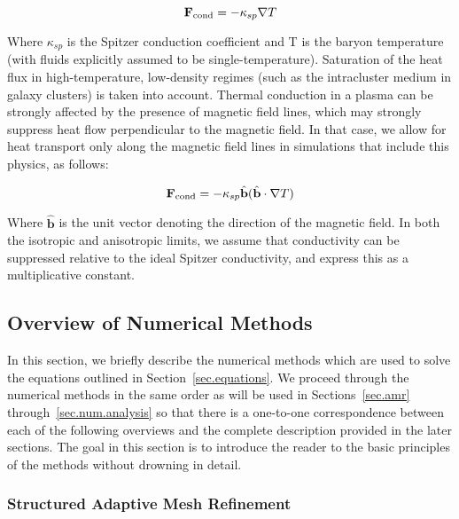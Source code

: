 \begin{equation}
\fcond = -\kappa_{sp} \nabla T
\end{equation}

Where $\kappa_{sp}$ is the Spitzer conduction coefficient
\citep{1962pfig.book.....S} and T is the baryon temperature (with
fluids explicitly assumed to be single-temperature).  Saturation of the heat flux in
high-temperature, low-density regimes (such as the intracluster medium
in galaxy clusters) is taken into account.  Thermal conduction in a
plasma can be strongly affected by the presence of magnetic field
lines, which may strongly suppress heat flow perpendicular to the
magnetic field.  In that case, we allow for heat transport only along
the magnetic field lines in simulations that include this physics, as follows:

\begin{equation}
\fcond= -\kappa_{sp} \hat{\textbf{b}} (\hat{\textbf{b}} \cdot \nabla T)
\end{equation}

Where $\hat{\textbf{b}}$ is the unit vector denoting the direction of the
magnetic field.  In both the isotropic and anisotropic limits, we
assume that conductivity can be suppressed relative to the ideal
Spitzer conductivity, and express this as a multiplicative constant.


\subsection{Overview of Numerical Methods}
\label{sec.method_overview}

In this section, we briefly describe the numerical methods which are
used to solve the equations outlined in Section~\ref{sec.equations}.  We
proceed through the numerical methods in the same order as will be used in
Sections~\ref{sec.amr} through~\ref{sec.num.analysis} so that there is a one-to-one correspondence
between each of the following overviews and the complete description
provided in the later sections.  The goal in this section is to introduce the reader to
the basic principles of the methods without drowning in detail.

\subsubsection{Structured Adaptive Mesh Refinement}


